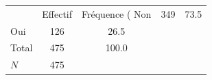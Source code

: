 {
\def\sym#1{\ifmmode^{#1}\else\(^{#1}\)\fi}
\begin{tabular}{l*{1}{cc}}
\toprule
            &    Effectif&Fréquence (%
\midrule
Non         &         349&        73.5\\
Oui         &         126&        26.5\\
Total       &         475&       100.0\\
\midrule
\(N\)       &         475&            \\
\bottomrule
\end{tabular}
}
